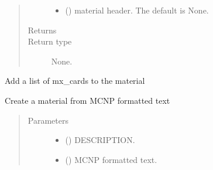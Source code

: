 \documentclass[letterpaper,10pt,english]{sphinxmanual}
\begin{document}
\begin{fulllineitems}
\begin{quote}
\begin{description}
\begin{itemize}
\item {} 
\sphinxAtStartPar
{} (\sphinxstyleliteralemphasis{\sphinxupquote{, }}) \textendash{} material header. The default is None.

\end{itemize}

\item[{Returns}] \leavevmode
\sphinxAtStartPar


\item[{Return type}] \leavevmode
\sphinxAtStartPar
None.

\end{description}\end{quote}

\begin{fulllineitems}
\label{\detokenize{api/inputgeneration:matreader.Material.add_mx}}
\sphinxAtStartPar
Add a list of mx\_cards to the material

\end{fulllineitems}


\begin{fulllineitems}
\label{\detokenize{api/inputgeneration:matreader.Material.from_text}}
\sphinxAtStartPar
Create a material from MCNP formatted text
\begin{quote}\begin{description}
\item[{Parameters}] \leavevmode\begin{itemize}
\item {} 
\sphinxAtStartPar
{} () \textendash{} DESCRIPTION.

\item {} 
\sphinxAtStartPar
{} (\sphinxstyleliteralemphasis{\sphinxupquote{{[}}}\sphinxstyleliteralemphasis{\sphinxupquote{{]}}}) \textendash{} MCNP formatted text.


\end{itemize}
\end{description}
\end{quote}
\end{fulllineitems}
\end{fulllineitems}
\end{document}

